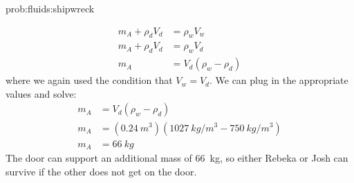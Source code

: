{{\begin{solution}{prob:fluids:shipwreck}
\begin{enumerate}[(a)]
\begin{align*}
m_A+\rho_dV_d&=\rho_wV_w\\
m_A+\rho_dV_d&=\rho_wV_d\\
m_A&=V_d(\rho_w-\rho_d)
\end{align*}
where we again used the condition that $V_w=V_d$. We can plug in the appropriate values and solve:
\begin{align*}
m_A&=V_d(\rho_w-\rho_d)\\
m_A&=(\SI{0.24}{m^3})(\SI{1027}{kg/m^3}-\SI{750}{kg/m^3})\\
m_A&=\SI{66}{kg}
\end{align*}
The door can support an additional mass of \SI{66}{kg}, so either Rebeka or Josh can survive if the other does not get on the door.  
\end{enumerate}
\end{solution}

}}
